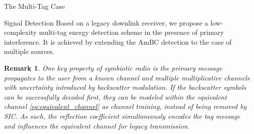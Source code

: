 \documentclass[journal]{IEEEtran}
\newtheorem{remark}{Remark}
\begin{document}
\begin{section}{The Multi-Tag Case}
		\begin{subsection}{Signal Detection}
			Based on a legacy downlink receiver, we propose a low-complexity multi-tag energy detection scheme in the presence of primary interference. It is achieved by extending the AmBC detection to the case of multiple sources.
			\begin{remark}
				One key property of symbiotic radio is the primary message propagates to the user from a known channel and multiple multiplicative channels with uncertainty introduced by backscatter modulation. If the backscatter symbols can be successfully decoded first, they can be modeled within the equivalent channel \eqref{eq:equivalent_channel} as channel training, instead of being removed by SIC. As such, the reflection coefficient simultaneously encodes the tag message and influences the equivalent channel for legacy transmission.
			\end{remark}


\end{subsection}
\end{section}
\end{document}
